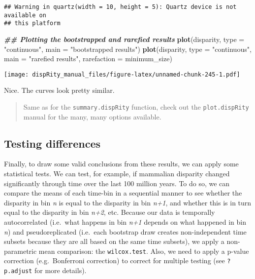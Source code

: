 \documentclass[
]{book}
\newenvironment{Shaded}{\begin{snugshade}}{\end{snugshade}}
\newcommand{\AttributeTok}[1]{\textcolor[rgb]{0.13,0.29,0.53}{#1}}
\newcommand{\DocumentationTok}[1]{\textcolor[rgb]{0.56,0.35,0.01}{\textbf{\textit{#1}}}}
\newcommand{\FunctionTok}[1]{\textcolor[rgb]{0.13,0.29,0.53}{\textbf{#1}}}
\newcommand{\NormalTok}[1]{#1}
\newcommand{\StringTok}[1]{\textcolor[rgb]{0.31,0.60,0.02}{#1}}
\begin{document}
\begin{verbatim}
## Warning in quartz(width = 10, height = 5): Quartz device is not available on
## this platform
\end{verbatim}

\begin{Shaded}
\begin{Highlighting}[]
\DocumentationTok{\#\# Plotting the bootstrapped and rarefied results}
\FunctionTok{plot}\NormalTok{(disparity, }\AttributeTok{type =} \StringTok{"continuous"}\NormalTok{, }\AttributeTok{main =} \StringTok{"bootstrapped results"}\NormalTok{)}
\FunctionTok{plot}\NormalTok{(disparity, }\AttributeTok{type =} \StringTok{"continuous"}\NormalTok{, }\AttributeTok{main =} \StringTok{"rarefied results"}\NormalTok{,}
     \AttributeTok{rarefaction =}\NormalTok{ minimum\_size)}
\end{Highlighting}
\end{Shaded}

\texttt{[image: dispRity\_manual\_files/figure-latex/unnamed-chunk-245-1.pdf]}

Nice. The curves look pretty similar.

\begin{quote}
Same as for the \texttt{summary.dispRity} function, check out the \texttt{plot.dispRity} manual for the many, many options available.
\end{quote}

\hypertarget{testing-differences}{%
\subsection{Testing differences}\label{testing-differences}}

Finally, to draw some valid conclusions from these results, we can apply some statistical tests.
We can test, for example, if mammalian disparity changed significantly through time over the last 100 million years.
To do so, we can compare the means of each time-bin in a sequential manner to see whether the disparity in bin \emph{n} is equal to the disparity in bin \emph{n+1}, and whether this is in turn equal to the disparity in bin \emph{n+2}, etc.
Because our data is temporally autocorrelated (i.e.~what happens in bin \emph{n+1} depends on what happened in bin \emph{n}) and pseudoreplicated (i.e.~each bootstrap draw creates non-independent time subsets because they are all based on the same time subsets), we apply a non-parametric mean comparison: the \texttt{wilcox.test}.
Also, we need to apply a p-value correction (e.g.~Bonferroni correction) to correct for multiple testing (see \texttt{?p.adjust} for more details).
\end{document}
